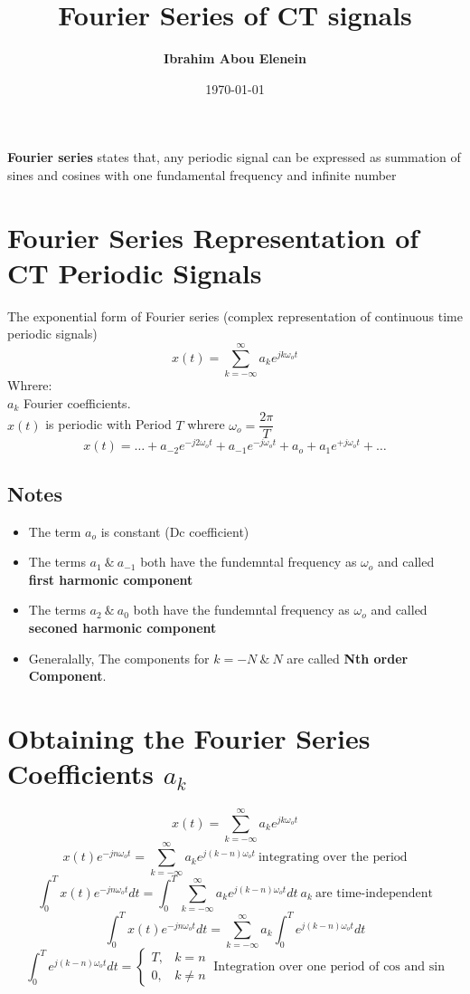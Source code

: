 \documentclass[11pt,a4paper]{article}
\theoremstyle{definition}
\begin{document}
\author{\textbf{Ibrahim Abou Elenein}}
\title{\textbf{Fourier Series of CT signals}}
\date {\today}
\maketitle

\textbf{Fourier series} states that, any periodic signal can 
be expressed as summation of sines and cosines 
with one fundamental frequency and infinite number

\section{Fourier Series Representation of CT Periodic Signals}
The exponential form of Fourier series (complex 
representation of continuous time periodic signals) 
\[
    \displaystyle  x(t) = \sum_{k=-\infty}^{\infty} a_k 
    e^{jk\omega_ot}
\]
Whrere: \\
$a_k$ Fourier coefficients.\\
$x(t)$ is periodic with Period $T$ whrere $\omega_o 
= \dfrac{2\pi}{T}$
\[
    x(t) = \dots + a_{-2}e^{-j2\omega_ot}
    + a_{-1}e^{-j\omega_ot} + a_o + a_{1}e^{+j\omega_ot} + \dots
\]

\subsection{Notes}
\begin{itemize}
    \item The term $a_o$ is constant (Dc coefficient)
    \item The terms $a_1  \ \& \  a_{-1}$ both have the fundemntal frequency
        as $\omega_o$ and called \textbf{first harmonic component}
    \item The terms $a_2  \ \& \  a_{0}$ both have the fundemntal frequency
        as $\omega_o$ and called \textbf{seconed harmonic component}
    \item Generalally, The components for $k=-N \ \& \ N$ are called 
        \textbf{Nth order Component}.

\end{itemize}
\section{Obtaining the Fourier Series Coefficients $a_k$}
\[
    \displaystyle x(t) = \sum_{k=-\infty}^{\infty} a_k e^{jk\omega_ot} 
\]
\[
    \displaystyle x(t)e^{-jn\omega_ot} = \sum_{k=-\infty}^{\infty} a_k e^{j(k-n)\omega_ot} \
    \text{integrating over the period}
\]
\[
    \displaystyle \int_0^T x(t)e^{-jn\omega_ot} dt =
    \int_0^T\sum_{k=-\infty}^{\infty} a_k e^{j(k-n)\omega_ot} dt \   a_k 
     \ \text{are time-independent}
\]
\[
    \displaystyle \int_0^T x(t)e^{-jn\omega_ot} dt =
    \sum_{k=-\infty}^{\infty} a_k \int_0^T e^{j(k-n)\omega_ot} dt 
\]
\[
    \displaystyle  \int_0^T e^{j(k-n)\omega_ot} dt = 
    \begin{cases}
        T, & k =n \\
        0, & k \neq n
    \end{cases} \ \text{Integration over one period of cos and sin}
\]
\end{document}
